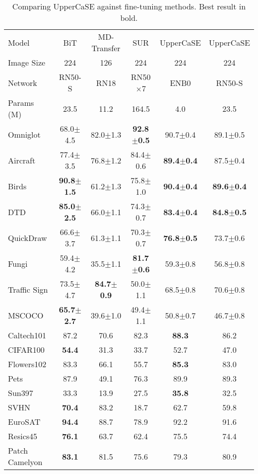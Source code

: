 \documentclass{article}
\begin{document}
\begin{table}[H]
\caption{Comparing UpperCaSE against fine-tuning methods. Best result in bold.}
\vskip 0.15in
\begin{center}
\begin{tabular}{lccccc}
\toprule
Model & BiT & MD-Transfer & SUR & UpperCaSE & UpperCaSE\\
Image Size & 224 & 126 & 224 & 224 & 224\\
Network & RN50-S & RN18 & RN50$\times$7 & ENB0 & RN50-S\\
Params (M) & 23.5 & 11.2 & 164.5 & 4.0 & 23.5 \\
\midrule
Omniglot & 68.0$\pm$4.5 & 82.0$\pm$1.3 & \textbf{92.8$\pm$0.5} & 90.7$\pm$0.4 & 89.1$\pm$0.5\\
Aircraft & 77.4$\pm$3.5 & 76.8$\pm$1.2 & 84.4$\pm$0.6 & \textbf{89.4$\pm$0.4} & 87.5$\pm$0.4\\
Birds & \textbf{90.8$\pm$1.5} & 61.2$\pm$1.3 & 75.8$\pm$1.0 & \textbf{90.4$\pm$0.4} & \textbf{89.6$\pm$0.4}\\
DTD & \textbf{85.0$\pm$2.5} & 66.0$\pm$1.1 & 74.3$\pm$0.7 & \textbf{83.4$\pm$0.4} & \textbf{84.8$\pm$0.5}\\
QuickDraw & 66.6$\pm$3.7 & 61.3$\pm$1.1 & 70.3$\pm$0.7 & \textbf{76.8$\pm$0.5} & 73.7$\pm$0.6\\
Fungi & 59.4$\pm$4.2 & 35.5$\pm$1.1 & \textbf{81.7$\pm$0.6} & 59.3$\pm$0.8 & 56.8$\pm$0.8\\
Traffic Sign & 73.5$\pm$4.7 & \textbf{84.7$\pm$0.9} & 50.0$\pm$1.1 & 68.5$\pm$0.8 & 70.6$\pm$0.8\\
MSCOCO & \textbf{65.7$\pm$2.7} & 39.6$\pm$1.0 & 49.4$\pm$1.1 & 50.8$\pm$0.7 & 46.7$\pm$0.8\\
\midrule
Caltech101 & 87.2 & 70.6 & 82.3 & \textbf{88.3} & 86.2\\
CIFAR100 & \textbf{54.4} & 31.3 & 33.7 & 52.7 & 47.0\\
Flowers102 & 83.3 & 66.1 & 55.7 & \textbf{85.3} & 83.0\\
Pets & 87.9 & 49.1 & 76.3 & 89.9 & 89.3\\
Sun397 & 33.3 & 13.9 & 27.5 & \textbf{35.8} & 32.5\\
SVHN & \textbf{70.4} & 83.2 & 18.7 & 62.7 & 59.8\\
\midrule
EuroSAT & \textbf{94.4} & 88.7 & 78.9 & 92.2 & 91.6\\
Resics45 & \textbf{76.1} & 63.7 & 62.4 & 75.5 & 74.4\\
Patch Camelyon & \textbf{83.1} & 81.5 & 75.6 & 79.3 & 80.9\\

\end{tabular}
\end{center}
\end{table}
\end{document}
